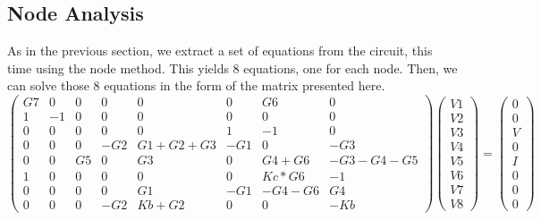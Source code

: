\subsection{Node Analysis}

As in the previous section, we extract a set of equations from the circuit, this time using the node method. This yields 8 equations, one for each node. Then, we can solve those 8 equations in the form of the matrix presented here.
\begin{equation}
\begin{pmatrix}
G7 & 0 & 0 & 0 & 0 & 0 & G6 & 0\\
1 & -1 & 0 & 0 & 0 & 0 & 0 & 0\\
0 & 0 & 0 & 0 & 0 & 1 & -1 & 0\\
0 & 0 & 0 & -G2 & G1+G2+G3 & -G1 & 0 & -G3\\
0 & 0 & G5 & 0 & G3 & 0 & G4+G6 & -G3-G4-G5\\
1 & 0 & 0 & 0 & 0 & 0& Kc*G6 & -1\\
0 & 0 & 0 & 0 & G1 & -G1 & -G4-G6 & G4\\
0 & 0 & 0 & -G2 & Kb+G2 & 0 & 0 & -Kb
\end{pmatrix}
\begin{pmatrix}
V1\\
V2\\
V3\\
V4\\
V5\\
V6\\
V7\\
V8
\end{pmatrix}
=
\begin{pmatrix}
0\\
0\\
V\\
0\\
I\\
0\\
0\\
0
\end{pmatrix}
\end{equation}

